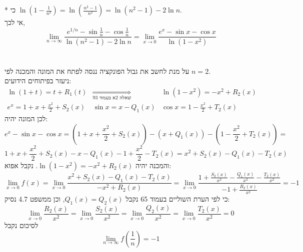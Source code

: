 \documentclass{article}
\newcommand\underrel[2]{\mathrel{\mathop{#2}\limits_{#1}}}
\begin{document}
* כי $\ln(1-\frac{1}{n^2}) = \ln(\frac{n^2-1}{n^2})=\ln(n^2-1)-2\ln n$. \\
אי לכך,
\[
    \lim_{n\rightarrow\infty} \frac{e^{1/n} -\sin \frac{1}{n} -\cos \frac{1}{n}}{\ln(n^2-1)-2\ln n} =
    \lim_{x\rightarrow 0} \frac{e^x -\sin x-\cos x}{\ln(1-x^2)}
\]
\\\\
על מנת לחשב את גבול הפונקציה ננסה לפתח את המונה והמכנה לפי $n=2$. \\
ניעזר בפיתוחים הידועים:
\[
    \begin{matrix}
        \ln(1+t) = t + R_1(t)               & \underrel{\text{שאלה 2א בעמוד 93}}{\Rightarrow} & \ln(1-x^2)=-x^2+R_2(x) \\
        e^x = 1 + x + \frac{x^2}{2}+ S_2(x) &
        \sin x = x - Q_1(x)                 &
        \cos x = 1 - \frac{x^2}{2} + T_2(x)
    \end{matrix}
\]
לכן המונה יהיה:
\[
    e^x-\sin x - \cos x =
    (1 + x + \frac{x^2}{2}+ S_2(x)) - (x + Q_1(x)) - (1 - \frac{x^2}{2} + T_2(x)) =
\]
\[
    1+x+\frac{x^2}{2}+ S_2(x) - x - Q_1(x) - 1 + \frac{x^2}{2} - T_2(x)=
    x^2+S_2(x)-Q_1(x)-T_2(x)
\]
והמכנה יהיה $\ln(1-x^2)=-x^2+R_2(x)$. נקבל אפוא:
\[
    \lim_{x\rightarrow 0} f(x) =
    \lim_{x\rightarrow 0} \frac{x^2+S_2(x)-Q_1(x)-T_2(x)}{-x^2+R_2(x)} =
    \lim_{x\rightarrow 0} \frac{1+\frac{S_2(x)}{x^2}-\frac{Q_1(x)}{x^2}-\frac{T_2(x)}{x^2}}{-1+\frac{R_2(x)}{x^2}} = -1
\]
כי לפי הערת השוליים בעמוד 65 נקבל $Q_1(x)=Q_2(x)$, וכן ממשפט 4.7 נסיק:
\[
    \lim_{x\rightarrow 0} \frac{R_2(x)}{x^2} =
    \lim_{x\rightarrow 0} \frac{S_2(x)}{x^2} =
    \lim_{x\rightarrow 0} \frac{Q_2(x)}{x^2} =
    \lim_{x\rightarrow 0} \frac{T_2(x)}{x^2} = 0
\]
לסיכום נקבל
\[
    \lim_{n\rightarrow \infty} f(\frac{1}{n}) = -1
\]
\end{document}
